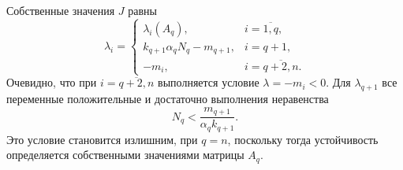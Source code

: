     Собственные значения \(J\) равны
    \begin{equation} \label{flow_jacobian_spectrum}
        \lambda_i = \left\{ \begin{matrix}
            \lambda_i (A_q), & i=\overline{1,q}, \\
            k_{q+1} \alpha_q N_q - m_{q+1}, & i=q+1, \\
            -m_i, & i=\overline{q+2, n}. 
        \end{matrix} \right.
    \end{equation}
    Очевидно, что при \(i = \overline{q+2,n}\) выполняется условие \(\lambda = -m_i < 0\). Для \(\lambda_{q+1}\) все переменные положительные и достаточно выполнения неравенства
    \begin{equation} \label{flow_nq_upper}
        N_q < \frac{m_{q+1}}{\alpha_q k_{q+1}}.
    \end{equation}
    Это условие становится излишним, при \(q = n\), поскольку тогда устойчивость определяется собственными значениями матрицы \(A_q\).

